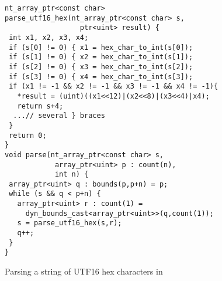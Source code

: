 \documentclass[conference]{IEEEtran}
\newcommand{\checkedc}{\text{Checked C}\xspace}
\begin{document}
\begin{figure}[t]
{\small
  \begin{lstlisting}[xleftmargin=4 mm]
nt_array_ptr<const char>
parse_utf16_hex(nt_array_ptr<const char> s,
                  ptr<uint> result) {
 int x1, x2, x3, x4;
 if (s[0] != 0) { x1 = hex_char_to_int(s[0]);
 if (s[1] != 0) { x2 = hex_char_to_int(s[1]);
 if (s[2] != 0) { x3 = hex_char_to_int(s[2]);
 if (s[3] != 0) { x4 = hex_char_to_int(s[3]);
 if (x1 != -1 && x2 != -1 && x3 != -1 && x4 != -1){
   *result = (uint)((x1<<12)|(x2<<8)|(x3<<4)|x4);
   return s+4;
  ...// several } braces
 } 
 return 0;
}
void parse(nt_array_ptr<const char> s,
            array_ptr<uint> p : count(n), 
            int n) {
 array_ptr<uint> q : bounds(p,p+n) = p;
 while (s && q < p+n) {
   array_ptr<uint> r : count(1) =
     dyn_bounds_cast<array_ptr<uint>>(q,count(1));
   s = parse_utf16_hex(s,r);
   q++;
 }
}
  \end{lstlisting}

}

\caption{Parsing a string of UTF16 hex characters in \checkedc}
\label{fig:checkedc-example}
\end{figure}
\end{document}
